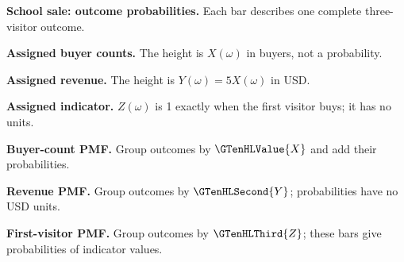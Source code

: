 \par\noindent \begin{minipage}[t]{.485\linewidth}
\centering
{}
\par\small \textbf{School sale: outcome probabilities.} Each bar describes one complete three-visitor outcome.
\end{minipage}\hfill\begin{minipage}[t]{.485\linewidth}
\centering
{}
\par\small \textbf{Assigned buyer counts.} The height is $X(\omega)$ in buyers, not a probability.
\end{minipage}\par\medskip
\par\noindent \begin{minipage}[t]{.485\linewidth}
\centering
{}
\par\small \textbf{Assigned revenue.} The height is $Y(\omega)=5X(\omega)$ in USD.
\end{minipage}\hfill\begin{minipage}[t]{.485\linewidth}
\centering
{}
\par\small \textbf{Assigned indicator.} $Z(\omega)$ is 1 exactly when the first visitor buys; it has no units.
\end{minipage}\par\medskip
\par\noindent \begin{minipage}[t]{.32\linewidth}
\centering
{}
\par\small \textbf{Buyer-count PMF.} Group outcomes by $\GTenHLValue{X}$ and add their probabilities.
\end{minipage}\hfill\begin{minipage}[t]{.32\linewidth}
\centering
{}
\par\small \textbf{Revenue PMF.} Group outcomes by $\GTenHLSecond{Y}$; probabilities have no USD units.
\end{minipage}\hfill\begin{minipage}[t]{.32\linewidth}
\centering
{}
\par\small \textbf{First-visitor PMF.} Group outcomes by $\GTenHLThird{Z}$; these bars give probabilities of indicator values.
\end{minipage}\par\medskip


